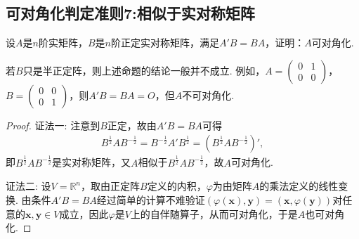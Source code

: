 \documentclass[../../main.tex]{subfiles}%
\begin{document}
\subsection{可对角化判定准则7:相似于实对称矩阵}

\begin{proposition}\label{proposition:例9.72}
设\(A\)是\(n\)阶实矩阵，\(B\)是\(n\)阶正定实对称矩阵，满足\(A'B = BA\)，证明：\(A\)可对角化.
\end{proposition}
\begin{remark}
若\(B\)只是半正定阵，则上述命题的结论一般并不成立. 例如，\(A=\begin{pmatrix}0&1\\0&0\end{pmatrix}\)，\(B=\begin{pmatrix}0&0\\0&1\end{pmatrix}\)，则\(A'B = BA = O\)，但\(A\)不可对角化. 
\end{remark}
\begin{proof}

{\color{blue}证法一:}
注意到\(B\)正定，故由\(A'B = BA\)可得
\begin{align*}
B^{\frac{1}{2}}AB^{-\frac{1}{2}}=B^{-\frac{1}{2}}A'B^{\frac{1}{2}}=(B^{\frac{1}{2}}AB^{-\frac{1}{2}})',
\end{align*}
即\(B^{\frac{1}{2}}AB^{-\frac{1}{2}}\)是实对称矩阵，又\(A\)相似于\(B^{\frac{1}{2}}AB^{-\frac{1}{2}}\)，故\(A\)可对角化.

{\color{blue}证法二:}
设\(V = \mathbb{R}^n\)，取由正定阵\(B\)定义的内积，\(\varphi\)为由矩阵\(A\)的乘法定义的线性变换. 由条件\(A'B = BA\)经过简单的计算不难验证\((\varphi(\boldsymbol{x}),\boldsymbol{y}) = (\boldsymbol{x},\varphi(\boldsymbol{y}))\)对任意的\(\boldsymbol{x},\boldsymbol{y}\in V\)成立，因此\(\varphi\)是\(V\)上的自伴随算子，从而可对角化，于是\(A\)也可对角化.
\end{proof}
\end{document}
